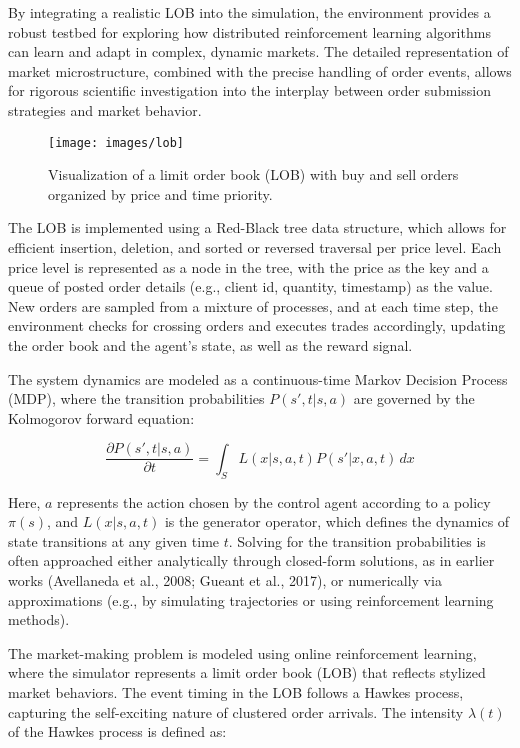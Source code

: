 \documentclass[11pt]{article}
\begin{document}
    By integrating a realistic LOB into the simulation, the environment provides a robust testbed for exploring how
    distributed reinforcement learning algorithms can learn and adapt in complex, dynamic markets.
    The detailed representation of market microstructure, combined with the precise handling of order events,
    allows for rigorous scientific investigation into the interplay between order submission strategies and market behavior.

    \begin{figure}[htb]
        \centering
        \texttt{[image: images/lob]}
        \caption{Visualization of a limit order book (LOB) with buy and sell orders organized by price and time priority.}
        \label{fig:lob}
    \end{figure}

    The LOB is implemented using a Red-Black tree data structure, which allows for efficient insertion, deletion,
    and sorted or reversed traversal per price level.
    Each price level is represented as a node in the tree, with the price as the key and a queue of posted order details
    (e.g., client id, quantity, timestamp) as the value.
    New orders are sampled from a mixture of processes, and at each time step, the environment checks for crossing orders and executes trades accordingly,
    updating the order book and the agent's state, as well as the reward signal.

    The system dynamics are modeled as a continuous-time Markov Decision Process (MDP), where the transition probabilities
    \( P(s', t|s, a) \) are governed by the Kolmogorov forward equation:

    \[
        \frac{\partial P(s', t|s, a)}{\partial t} = \int_S L(x|s, a, t) P(s'|x, a, t) \, dx
    \]

    Here, \( a \) represents the action chosen by the control agent according to a policy \( \pi(s) \), and \( L(x|s, a, t) \) is the generator operator,
    which defines the dynamics of state transitions at any given time \( t \).
    Solving for the transition probabilities is often approached either analytically through closed-form solutions,
    as in earlier works (Avellaneda et al., 2008; Gueant et al., 2017),
    or numerically via approximations (e.g., by simulating trajectories or using reinforcement learning methods).

    The market-making problem is modeled using online reinforcement learning, where the simulator represents a
    limit order book (LOB) that reflects stylized market behaviors.
    The event timing in the LOB follows a Hawkes process, capturing the self-exciting nature of clustered order arrivals.
    The intensity \( \lambda(t) \) of the Hawkes process is defined as:
\end{document}
